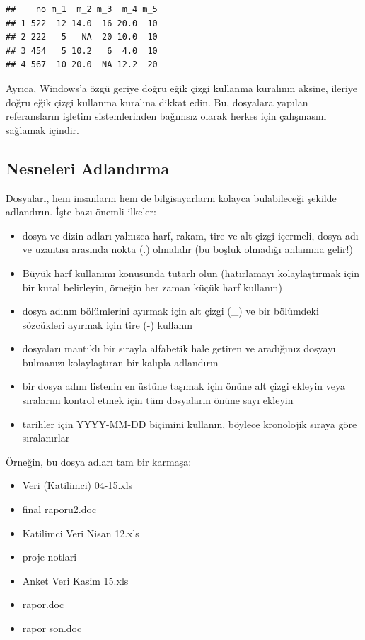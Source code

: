 \documentclass[
  oneside]{book}
\providecommand{\tightlist}{%
  \setlength{\itemsep}{0pt}\setlength{\parskip}{0pt}}
\begin{document}
\begin{verbatim}
##    no m_1  m_2 m_3  m_4 m_5
## 1 522  12 14.0  16 20.0  10
## 2 222   5   NA  20 10.0  10
## 3 454   5 10.2   6  4.0  10
## 4 567  10 20.0  NA 12.2  20
\end{verbatim}

\begin{info}
Ayrıca, Windows'a özgü geriye doğru eğik çizgi kullanma kuralının aksine, ileriye doğru eğik çizgi kullanma kuralına dikkat edin. Bu, dosyalara yapılan referansların işletim sistemlerinden bağımsız olarak herkes için çalışmasını sağlamak içindir.

\end{info}

\hypertarget{nesneleri-adlandux131rma}{%
\subsection{Nesneleri Adlandırma}\label{nesneleri-adlandux131rma}}

Dosyaları, hem insanların hem de bilgisayarların kolayca bulabileceği şekilde adlandırın. İşte bazı önemli ilkeler:

\begin{itemize}
\tightlist
\item
  dosya ve dizin adları yalnızca harf, rakam, tire ve alt çizgi içermeli, dosya adı ve uzantısı arasında nokta (.) olmalıdır (bu boşluk olmadığı anlamına gelir!)
\item
  Büyük harf kullanımı konusunda tutarlı olun (hatırlamayı kolaylaştırmak için bir kural belirleyin, örneğin her zaman küçük harf kullanın)
\item
  dosya adının bölümlerini ayırmak için alt çizgi (\_) ve bir bölümdeki sözcükleri ayırmak için tire (-) kullanın
\item
  dosyaları mantıklı bir sırayla alfabetik hale getiren ve aradığınız dosyayı bulmanızı kolaylaştıran bir kalıpla adlandırın
\item
  bir dosya adını listenin en üstüne taşımak için önüne alt çizgi ekleyin veya sıralarını kontrol etmek için tüm dosyaların önüne sayı ekleyin
\item
  tarihler için YYYY-MM-DD biçimini kullanın, böylece kronolojik sıraya göre sıralanırlar
\end{itemize}

Örneğin, bu dosya adları tam bir karmaşa:

\begin{itemize}
\tightlist
\item
  Veri (Katilimci) 04-15.xls
\item
  final raporu2.doc
\item
  Katilimci Veri Nisan 12.xls
\item
  proje notlari
\item
  Anket Veri Kasim 15.xls
\item
  rapor.doc
\item
  rapor son.doc
\end{itemize}
\end{document}
